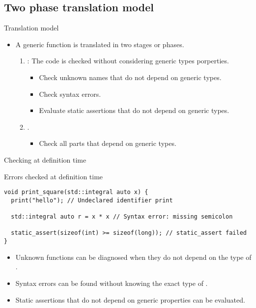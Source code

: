 \subsection{Two phase translation model}

\begin{frame}[t,fragile]{Translation model}
\begin{itemize}
  \item A generic function is translated in two stages or phases.

  \begin{enumerate}

    \item {}:
          The code is checked without considering generic types porperties.
      \begin{itemize}
        \item Check unknown names that do not depend on generic types.
        \item Check syntax errors.
        \item Evaluate static assertions that do not depend on generic types.
      \end{itemize}
    

    \item {}.
      \begin{itemize}
        \item Check all parts that depend on generic types.
      \end{itemize}

  \end{enumerate}
\end{itemize}
\end{frame}

\begin{frame}[t,fragile]{Checking at definition time}
\begin{block}{Errors checked at definition time}
\begin{lstlisting}
void print_square(std::integral auto x) {
  print("hello"); // Undeclared identifier print

  std::integral auto r = x * x // Syntax error: missing semicolon

  static_assert(sizeof(int) >= sizeof(long)); // static_assert failed
}
\end{lstlisting}
\end{block}

  \begin{itemize}
    \item Unknown functions can be diagnosed when they do not depend on the type of .

    \item Syntax errors can be found without knowing the exact type of .

    \item Static assertions that do not depend on generic properties can be evaluated.
  \end{itemize}
\end{frame}

